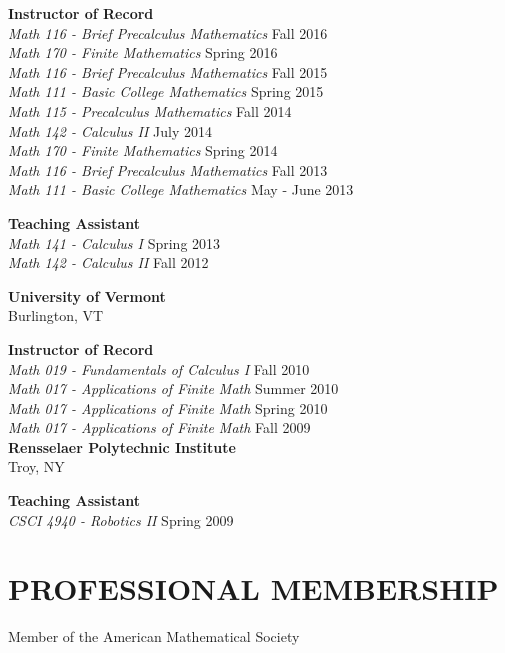 \documentclass[line,overlapped]{res}
\begin{document}
\begin{resume}
         {\bf Instructor of Record}\\
         \textsl{Math 116 - Brief Precalculus Mathematics} \hfill Fall 2016\\
         \textsl{Math 170 - Finite Mathematics} \hfill Spring 2016\\
         \textsl{Math 116 - Brief Precalculus Mathematics} \hfill Fall 2015\\
         \textsl{Math 111 - Basic College Mathematics} \hfill Spring 2015\\
         \textsl{Math 115 - Precalculus Mathematics} \hfill Fall 2014\\
         \textsl{Math 142 - Calculus II} \hfill July 2014\\
         \textsl{Math 170 - Finite Mathematics} \hfill Spring 2014\\
         \textsl{Math 116 - Brief Precalculus Mathematics} \hfill Fall 2013\\
         \textsl{Math 111 - Basic College Mathematics} \hfill May - June 2013

         {\bf Teaching Assistant}\\
         \textsl{Math 141 - Calculus I} \hfill Spring 2013\\
         \textsl{Math 142 - Calculus II} \hfill Fall 2012

         {\bf University of Vermont}\\Burlington, VT
         
         {\bf Instructor of Record}\\
         \textsl{Math 019 - Fundamentals of Calculus I} \hfill Fall 2010\\
         \textsl{Math 017 - Applications of Finite Math} \hfill Summer 2010\\
         \textsl{Math 017 - Applications of Finite Math} \hfill Spring 2010\\
         \textsl{Math 017 - Applications of Finite Math} \hfill Fall 2009\\
         
         {\bf Rensselaer Polytechnic Institute}\\Troy, NY

         {\bf Teaching Assistant}\\
         \textsl{CSCI 4940 - Robotics II} \hfill Spring 2009\\
 \section{PROFESSIONAL MEMBERSHIP}
         Member of the American Mathematical Society

\end{resume}
\end{document}
